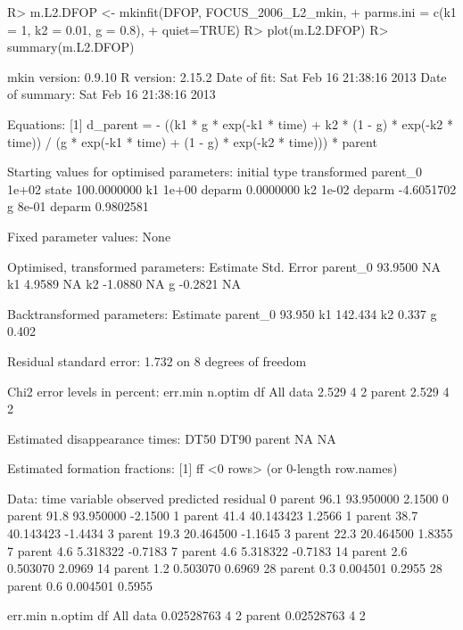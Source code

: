 \documentclass[12pt,a4paper]{article}
\begin{document}
\begin{Schunk}
\begin{Sinput}
R> m.L2.DFOP <- mkinfit(DFOP, FOCUS_2006_L2_mkin, 
+   parms.ini = c(k1 = 1, k2 = 0.01, g = 0.8),
+   quiet=TRUE)
R> plot(m.L2.DFOP)
R> summary(m.L2.DFOP)
\end{Sinput}
\begin{Soutput}
mkin version:    0.9.10 
R version:       2.15.2 
Date of fit:     Sat Feb 16 21:38:16 2013 
Date of summary: Sat Feb 16 21:38:16 2013 

Equations:
[1] d_parent = - ((k1 * g * exp(-k1 * time) + k2 * (1 - g) * exp(-k2 * time)) / (g * exp(-k1 * time) + (1 - g) * exp(-k2 * time))) * parent

Starting values for optimised parameters:
         initial   type transformed
parent_0   1e+02  state 100.0000000
k1         1e+00 deparm   0.0000000
k2         1e-02 deparm  -4.6051702
g          8e-01 deparm   0.9802581

Fixed parameter values:
None

Optimised, transformed parameters:
         Estimate Std. Error
parent_0  93.9500         NA
k1         4.9589         NA
k2        -1.0880         NA
g         -0.2821         NA

Backtransformed parameters:
         Estimate
parent_0   93.950
k1        142.434
k2          0.337
g           0.402

Residual standard error: 1.732 on 8 degrees of freedom

Chi2 error levels in percent:
         err.min n.optim df
All data   2.529       4  2
parent     2.529       4  2

Estimated disappearance times:
       DT50 DT90
parent   NA   NA

Estimated formation fractions:
[1] ff
<0 rows> (or 0-length row.names)

Data:
 time variable observed predicted residual
    0   parent     96.1 93.950000   2.1500
    0   parent     91.8 93.950000  -2.1500
    1   parent     41.4 40.143423   1.2566
    1   parent     38.7 40.143423  -1.4434
    3   parent     19.3 20.464500  -1.1645
    3   parent     22.3 20.464500   1.8355
    7   parent      4.6  5.318322  -0.7183
    7   parent      4.6  5.318322  -0.7183
   14   parent      2.6  0.503070   2.0969
   14   parent      1.2  0.503070   0.6969
   28   parent      0.3  0.004501   0.2955
   28   parent      0.6  0.004501   0.5955
\end{Soutput}
\begin{Soutput}
            err.min n.optim df
All data 0.02528763       4  2
parent   0.02528763       4  2
\end{Soutput}
\end{Schunk}
\end{document}
